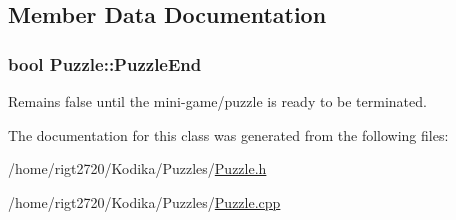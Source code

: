 \subsection{Member Data Documentation}
\hypertarget{classPuzzle_a965ad54e9f7340c3cad944fc82c61a2b}{
\subsubsection[{Puzzle\-End}]{\setlength{\rightskip}{0pt plus 5cm}bool Puzzle\-::\-Puzzle\-End\hspace{0.3cm}{\ttfamily [protected]}}}\label{classPuzzle_a965ad54e9f7340c3cad944fc82c61a2b}


Remains false until the mini-\/game/puzzle is ready to be terminated. 



The documentation for this class was generated from the following files\-:\begin{DoxyCompactItemize}
\item 
/home/rigt2720/\-Kodika/\-Puzzles/\hyperlink{Puzzle_8h}{Puzzle.\-h}\item 
/home/rigt2720/\-Kodika/\-Puzzles/\hyperlink{Puzzle_8cpp}{Puzzle.\-cpp}\end{DoxyCompactItemize}
